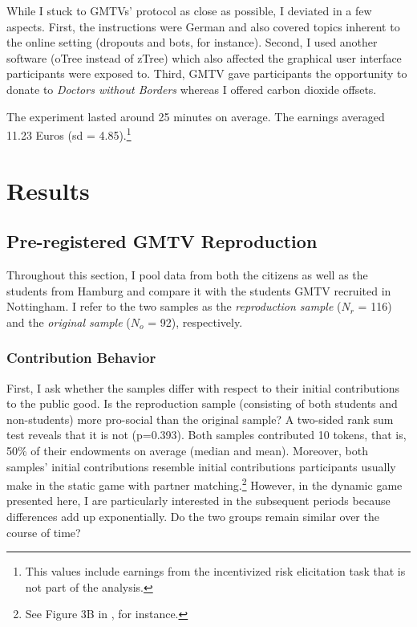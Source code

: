 \documentclass[
  authoryear,
  review,
  3p,
  onecolumn]{elsarticle}
\begin{document}
While I stuck to GMTVs' protocol as close as possible, I deviated in a
few aspects. First, the instructions were German and also covered topics
inherent to the online setting (dropouts and bots, for instance).
Second, I used another software (oTree instead of zTree) which also
affected the graphical user interface participants were exposed to.
Third, GMTV gave participants the opportunity to donate to \emph{Doctors
without Borders} whereas I offered carbon dioxide offsets.

The experiment lasted around 25 minutes on average. The earnings
averaged 11.23 Euros (sd = 4.85).\footnote{This values include earnings
  from the incentivized risk elicitation task that is not part of the
  analysis.}

\hypertarget{sec-results}{%
\section{Results}\label{sec-results}}

\hypertarget{sec-replication}{%
\subsection{Pre-registered GMTV Reproduction}\label{sec-replication}}

Throughout this section, I pool data from both the citizens as well as
the students from Hamburg and compare it with the students GMTV
recruited in Nottingham. I refer to the two samples as the
\emph{reproduction sample} (\(N_r\) = 116) and the \emph{original
sample} (\(N_o\) = 92), respectively.

\hypertarget{sec-contributions}{%
\subsubsection{Contribution Behavior}\label{sec-contributions}}

First, I ask whether the samples differ with respect to their initial
contributions to the public good. Is the reproduction sample (consisting
of both students and non-students) more pro-social than the original
sample? A two-sided rank sum test reveals that it is not (p=0.393). Both
samples contributed 10 tokens, that is, 50\% of their endowments on
average (median and mean). Moreover, both samples' initial contributions
resemble initial contributions participants usually make in the static
game with partner matching.\footnote{See Figure 3B in
  \citet[p.989]{fehrgaechter2000}, for instance.} However, in the
dynamic game presented here, I are particularly interested in the
subsequent periods because differences add up exponentially. Do the two
groups remain similar over the course of time?
\end{document}
